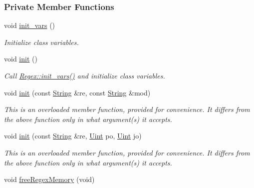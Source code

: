 \subsubsection*{Private Member Functions}
\begin{DoxyCompactItemize}
\item 
void \hyperlink{classjpcre2_1_1Regex_aff1f5cd95b6ac227014e7a5265a50cc0}{init\+\_\+vars} ()\hypertarget{classjpcre2_1_1Regex_aff1f5cd95b6ac227014e7a5265a50cc0}{}\label{classjpcre2_1_1Regex_aff1f5cd95b6ac227014e7a5265a50cc0}

\begin{DoxyCompactList}\small\item\em Initialize class variables. \end{DoxyCompactList}\item 
void \hyperlink{classjpcre2_1_1Regex_a6df564d3dec70bbeec65de125c7d4de2}{init} ()
\begin{DoxyCompactList}\small\item\em Call \hyperlink{classjpcre2_1_1Regex_aff1f5cd95b6ac227014e7a5265a50cc0}{Regex\+::init\+\_\+vars()} and initialize class variables. \end{DoxyCompactList}\item 
void \hyperlink{classjpcre2_1_1Regex_aedc5f414e5fa401e1a91614cfab0b033}{init} (const \hyperlink{namespacejpcre2_a91f03070152fb228bc116c5a737f1d16}{String} \&re, const \hyperlink{namespacejpcre2_a91f03070152fb228bc116c5a737f1d16}{String} \&mod)
\begin{DoxyCompactList}\small\item\em This is an overloaded member function, provided for convenience. It differs from the above function only in what argument(s) it accepts. \end{DoxyCompactList}\item 
void \hyperlink{classjpcre2_1_1Regex_adbda074677e393438452190e55a971d0}{init} (const \hyperlink{namespacejpcre2_a91f03070152fb228bc116c5a737f1d16}{String} \&re, \hyperlink{namespacejpcre2_a078242d38221a13fb3543b9edd78c099}{Uint} po, \hyperlink{namespacejpcre2_a078242d38221a13fb3543b9edd78c099}{Uint} jo)
\begin{DoxyCompactList}\small\item\em This is an overloaded member function, provided for convenience. It differs from the above function only in what argument(s) it accepts. \end{DoxyCompactList}\item 
void \hyperlink{classjpcre2_1_1Regex_a40128e1facd915e06089eeb17e2287c2}{free\+Regex\+Memory} (void)\hypertarget{classjpcre2_1_1Regex_a40128e1facd915e06089eeb17e2287c2}{}\label{classjpcre2_1_1Regex_a40128e1facd915e06089eeb17e2287c2}


\end{DoxyCompactItemize}
